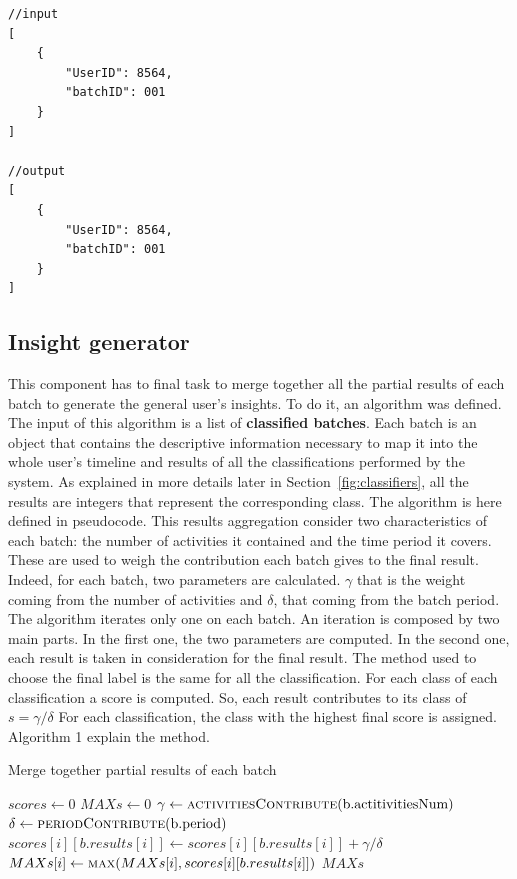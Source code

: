 \begin{multicols}{2}
\begin{verbatim}
//input
[
    {
        "UserID": 8564,
        "batchID": 001
    }
]
            
//output
[
    {
        "UserID": 8564,
        "batchID": 001
    }
]
\end{verbatim}
\end{multicols}

\subsection{Insight generator}
\label{sec:Generator}
This component has to final task to merge together all the partial results of each batch to generate the general user's insights.
To do it, an algorithm was defined. The input of this algorithm is a list of \textbf{classified batches}.
Each batch is an object that contains the descriptive information necessary to map it into the whole user's timeline and results of all the classifications performed by the system.
As explained in more details later in Section~\ref{fig:classifiers}, all the results are integers that represent the corresponding class.
The algorithm is here defined in pseudocode. This results aggregation consider two characteristics of each batch: the number of activities it contained and the time period it covers.
These are used to weigh the contribution each batch gives to the final result. Indeed, for each batch, two parameters are calculated.
$\gamma$ that is the weight coming from the number of activities and $\delta$, that coming from the batch period.
The algorithm iterates only one on each batch. An iteration is composed by two main parts. In the first one, the two parameters are computed. In the second one, each result is taken in consideration for the final result.
The method used to choose the final label is the same for all the classification. For each class of each classification a score is computed. So, each result contributes to its class of $s = \gamma / \delta$
For each classification, the class with the highest final score is assigned. Algorithm 1 explain the method.

\begin{algorithm}
\caption{Merge together partial results of each batch}
\label{algoGenerator}
\begin{algorithmic}[1]
\State $scores \gets 0$
\State $MAXs \gets 0$
    \State $\gamma \gets \Call{activitiesContribute}{\text{b.actitivitiesNum}}$
    \State $\delta \gets \Call{periodContribute}{\text{b.period}}$
        \State $scores[i][b.results[i]] \gets scores[i][b.results[i]] + \gamma/\delta$
        \State $MAXs[i] \gets \Call{max}{MAXs[i], scores[i][b.results[i]]}$
    \EndFor
\EndFor
\Return $MAXs$
\EndFunction
\end{algorithmic}
\end{algorithm}

